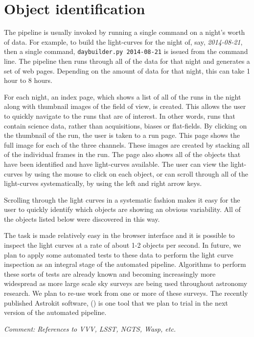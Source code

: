 
\section{Object identification}
The pipeline is usually invoked by running a single command on a night's worth of data. For example, to build the light-curves for the night of, say, \emph{2014-08-21}, then a single command, \texttt{daybuilder.py 2014-08-21} is issued from the command line. The pipeline then runs through all of the data for that night and generates a set of web pages. Depending on the amount of data for that night, this can take 1 hour to 8 hours. 

For each night, an index page, which shows a list of all of the runs in the night along with thumbnail images of the field of view, is created. This allows the user to quickly navigate to the runs that are of interest. In other words, runs that contain science data, rather than acquisitions, biases or flat-fields. By clicking on the thumbnail of the run, the user is taken to a run page. This page shows the full image for each of the three channels. These images are created by stacking all of the individual frames in the run. The page also shows all of the objects that have been identified and have light-curves available. The user can view the light-curves by using the mouse to click on each object, or can scroll through all of the light-curves systematically, by using the left and right arrow keys. 

Scrolling through the light curves in a systematic fashion makes it easy for the user to quickly identify which objects are showing an obvious variability. All of the objects listed below were discovered in this way. 

The task is made relatively easy in the browser interface and it is possible to inspect the light curves at a rate of about 1-2 objects per second. In future, we plan to apply some automated tests to these data to perform the light curve inspection as an integral stage of the automated pipeline. Algorithms to perform these sorts of tests are already known and becoming increasingly more widespread as more large scale sky surveys are being used throughout astronomy research. We plan to re-use work from one or more of these surveys. The recently published Astrokit software, (\cite{Astrokit2014}) is one tool that we plan to trial in the next version of the automated pipeline. 

\emph{Comment: References to VVV, LSST, NGTS, Wasp,  etc.}


